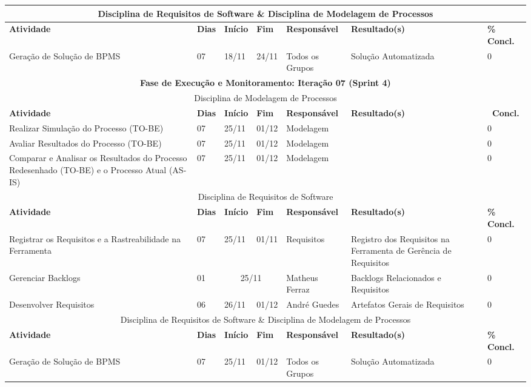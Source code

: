 \begin{landscape}
\begin{center}
\begin{tabular}{|m{6cm}|m{1cm}|m{1cm}|m{1cm}|m{4cm}|m{6cm}|m{2cm}|}
			\multicolumn{7}{|c|}{Disciplina de Requisitos de Software \& Disciplina de Modelagem de Processos} \\ \hline
			\textbf{Atividade} & \textbf{Dias} & \textbf{Início} & \textbf{Fim} & \textbf{Responsável} & \textbf{Resultado(s)} & \textbf{\% Concl.} \\ \hline
			Geração de Solução de BPMS & 07 & 18/11 & 24/11 & Todos os Grupos & Solução Automatizada & 0 \\ \hline
			\multicolumn{7}{|c|}{\textbf{Fase de Execução e Monitoramento: Iteração 07 (Sprint 4)}} \\
			\hline
			\multicolumn{7}{|c|}{Disciplina de Modelagem de Processos} \\
			\hline
			\textbf{Atividade} & \textbf{Dias} & \textbf{Início} & \textbf{Fim} & \textbf{Responsável} & \textbf{Resultado(s)} & \textbf{\ Concl.} \\ \hline
			Realizar Simulação do Processo (TO-BE) & 07 & 25/11 & 01/12 & Modelagem & & 0 \\ \hline
			Avaliar Resultados do Processo (TO-BE) & 07 & 25/11 & 01/12 & Modelagem & & 0 \\ \hline
			Comparar e Analisar os Resultados do Processo Redesenhado (TO-BE) e o Processo Atual (AS-IS) & 07 & 25/11 & 01/12 & Modelagem & & 0 \\ \hline
			\multicolumn{7}{|c|}{Disciplina de Requisitos de Software} \\
			\hline
			\textbf{Atividade} & \textbf{Dias} & \textbf{Início} & \textbf{Fim} & \textbf{Responsável} & \textbf{Resultado(s)} & \textbf{\% Concl.} \\ \hline
			Registrar os Requisitos e a Rastreabilidade na Ferramenta & 07 & 25/11 & 01/11 & Requisitos & Registro dos Requisitos na Ferramenta de Gerência de Requisitos & 0 \\ \hline
			Gerenciar Backlogs & 01 & \multicolumn{2}{c|}{25/11} & Matheus Ferraz & Backlogs Relacionados e Requisitos & 0 \\ \hline
			Desenvolver Requisitos & 06 & 26/11 & 01/12 & André Guedes & Artefatos Gerais de Requisitos & 0 \\ \hline
			\multicolumn{7}{|c|}{Disciplina de Requisitos de Software \& Disciplina de Modelagem de Processos} \\ \hline
			\textbf{Atividade} & \textbf{Dias} & \textbf{Início} & \textbf{Fim} & \textbf{Responsável} & \textbf{Resultado(s)} & \textbf{\% Concl.} \\ \hline
			Geração de Solução de BPMS & 07 & 25/11 & 01/12 & Todos os Grupos & Solução Automatizada & 0 \\ \hline

\end{tabular}
\end{center}
\end{landscape}
